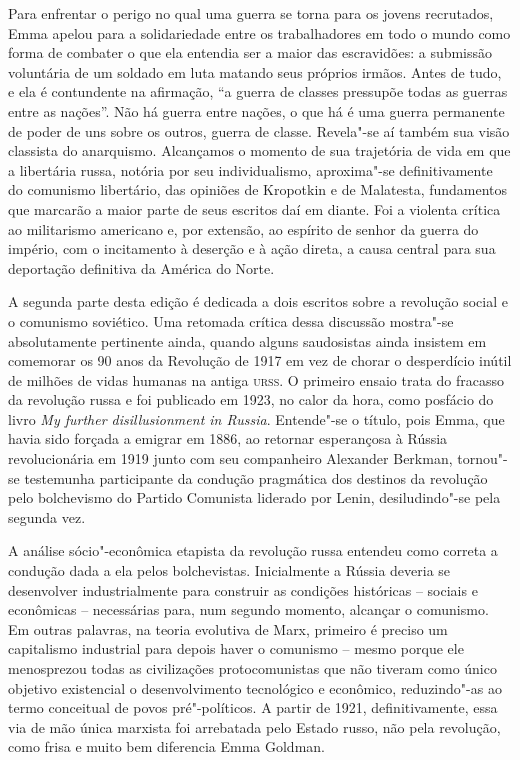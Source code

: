Para enfrentar o perigo no qual uma guerra se torna para os jovens
recrutados, Emma apelou para a solidariedade entre os trabalhadores em
todo o mundo como forma de combater o que ela entendia ser a maior das
escravidões: a submissão voluntária de um soldado em luta matando seus
próprios irmãos. Antes de tudo, e ela é contundente na afirmação, “a
guerra de classes pressupõe todas as guerras entre as nações”.  Não há
guerra entre nações, o que há é uma guerra permanente de poder de uns
sobre os outros, guerra de classe. Revela"-se aí também sua visão
classista do anarquismo. Alcançamos o momento de sua trajetória de vida
em que a libertária russa, notória por seu individualismo,
aproxima"-se definitivamente do comunismo libertário, das opiniões de
Kropotkin e de Malatesta, fundamentos que marcarão a maior parte de 
seus escritos daí em diante. Foi a violenta crítica ao militarismo
americano e, por extensão, ao espírito de senhor da guerra do império,
com o incitamento à deserção e à ação direta, a causa central para sua
deportação definitiva da América do Norte.

 

A segunda parte desta edição é dedicada a dois escritos sobre a
revolução social e o comunismo soviético. Uma retomada crítica dessa
discussão mostra"-se absolutamente pertinente ainda, quando
alguns saudosistas ainda insistem em comemorar os 90 anos da Revolução
de 1917 em vez de chorar o desperdício inútil de milhões de vidas
humanas na antiga \textsc{urss}. O primeiro ensaio trata do fracasso da
revolução russa e foi publicado em 1923, no calor da hora, como
posfácio do livro \textit{My further disillusionment in Russia}. Entende"-se o
título, pois Emma, que havia sido forçada a emigrar em 1886, ao
retornar esperançosa à Rússia revolucionária em 1919 junto com seu
companheiro Alexander Berkman, tornou"-se testemunha participante da
condução pragmática dos destinos da revolução pelo bolchevismo do
Partido Comunista liderado por Lenin, desiludindo"-se pela segunda
vez.

A análise sócio"-econômica etapista da revolução russa entendeu como
correta a condução dada a ela pelos bolchevistas. Inicialmente a Rússia
deveria se desenvolver industrialmente para construir as condições
históricas – sociais e econômicas – necessárias para, num segundo
momento, alcançar o comunismo. Em outras palavras, na teoria evolutiva
de Marx, primeiro é preciso um capitalismo industrial para depois haver
o comunismo – mesmo porque ele menosprezou todas as civilizações
protocomunistas que não tiveram como único objetivo existencial o
desenvolvimento tecnológico e econômico, reduzindo"-as ao termo
conceitual de povos pré"-políticos. A partir de 1921, definitivamente,
essa via de mão única marxista foi arrebatada pelo Estado russo, não
pela revolução, como frisa e muito bem diferencia Emma Goldman.

